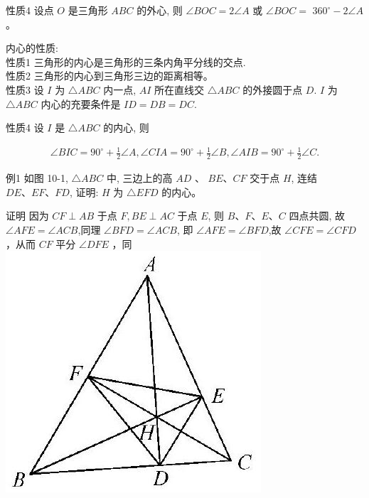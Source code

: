\documentclass[10pt]{article}
\begin{document}
性质4 设点 $O$ 是三角形 $A B C$ 的外心, 则 $\angle B O C=2 \angle A$ 或 $\angle B O C=$ $360^{\circ}-2 \angle A$ 。

内心的性质:\\
性质1 三角形的内心是三角形的三条内角平分线的交点.\\
性质2 三角形的内心到三角形三边的距离相等。\\
性质3 设 $I$ 为 $\triangle A B C$ 内一点, $A I$ 所在直线交 $\triangle A B C$ 的外接圆于点 $D$. $I$ 为 $\triangle A B C$ 内心的充要条件是 $I D=D B=D C$.

性质4 设 $I$ 是 $\triangle A B C$ 的内心, 则

\begin{align*}
\angle B I C=90^{\circ}+\frac{1}{2} \angle A, \angle C I A=90^{\circ}+\frac{1}{2} \angle B, \angle A I B=90^{\circ}+\frac{1}{2} \angle C .
\end{align*}

例1 如图 10-1, $\triangle A B C$ 中, 三边上的高 $A D$ 、 $B E 、 C F$ 交于点 $H$, 连结 $D E 、 E F 、 F D$, 证明: $H$ 为 $\triangle E F D$ 的内心。

证明 因为 $C F \perp A B$ 于点 $F, B E \perp A C$ 于点 $E$, 则 $B 、 F 、 E 、 C$ 四点共圆, 故 $\angle A F E=\angle A C B$,同理 $\angle B F D=\angle A C B$, 即 $\angle A F E=\angle B F D$,故 $\angle C F E=\angle C F D$ ，从而 $C F$ 平分 $\angle D F E$ ，同\\
\includegraphics[max width=\textwidth, center]{2024_10_30_66b8e5e701da2093c133g-071}
\end{document}
